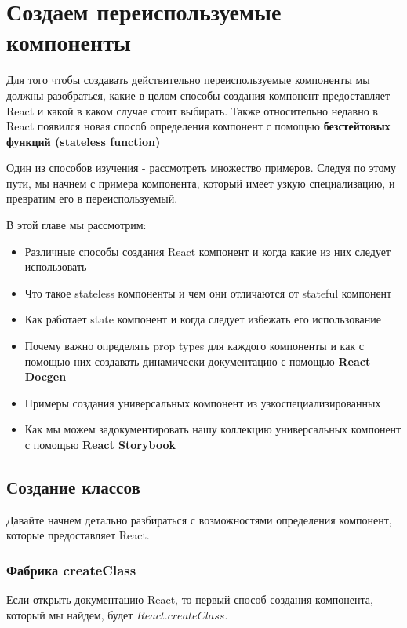\chapter{Создаем переиспользуемые компоненты}

Для того чтобы создавать действительно переиспользуемые компоненты мы должны разобраться, какие в целом способы создания компонент предоставляет React и какой в каком случае стоит выбирать. Также относительно недавно в React появился новая способ определения компонент с помощью \textbf{безстейтовых функций (stateless function)}

Один из способов изучения - рассмотреть множество примеров. Следуя по этому пути, мы начнем с примера компонента, который имеет узкую специализацию, и превратим его в переиспользуемый.

В этой главе мы рассмотрим:

\begin{itemize}
  \item Различные способы создания React компонент и когда какие из них следует использовать
  \item Что такое stateless компоненты и чем они отличаются от stateful компонент
  \item Как работает state компонент и когда следует избежать его использование
  \item Почему важно определять prop types для каждого компоненты и как с помощью них создавать динамически документацию с помощью \textbf{React Docgen}
  \item Примеры создания универсальных компонент из узкоспециализированных
  \item Как мы можем задокументировать нашу коллекцию универсальных компонент с помощью \textbf{React Storybook}
\end{itemize}


\section{Создание классов}

Давайте начнем детально разбираться с возможностями определения компонент, которые предоставляет React.

\subsection{Фабрика createClass}

Если открыть документацию React, то первый способ создания компонента, который мы найдем, будет $React.createClass$.

